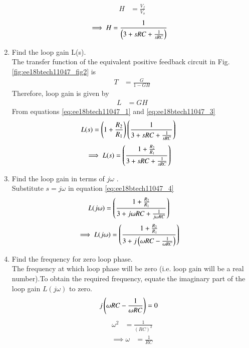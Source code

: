 \begin{enumerate}[label=\arabic*.,ref=\theenumi]
\begin{align}
H &= \frac{V_{f}}{V_{o}}
\end{align}
\begin{align}
\label{eq:ee18btech11047_3}
\implies H &= \frac{1}{\brak{3+sRC +\frac{1}{sRC}}}
\end{align}
%
\item Find the loop gain L(s).\\
\solution The transfer function of the equivalent positive feedback circuit in Fig. \ref{fig:ee18btech11047_fig2} is  
\begin{align}
T &= \frac{G}{1-GH}
\label{eq:ee18btech11047_TF}
\end{align}
Therefore, loop gain is given by 
\begin{align}
L &= GH
\end{align}
From equations \eqref{eq:ee18btech11047_1} and \eqref{eq:ee18btech11047_3}
\begin{align}
L(s) &= \left(1 + \frac{R_{2}}{R_{1}}\right)\left(\frac{1}{3+sRC+\frac{1}{sRC}}\right)
\end{align}
\begin{align}
\label{eq:ee18btech11047_4}
\implies L(s) &= \brak{\frac{1+\frac{R_{2}}{R_{1}}}{3+sRC+\frac{1}{sRC}}}
\end{align}
%
\item Find the loop gain in terms of $j\omega$ .\\
\solution Substitute $s = j\omega$ in equation \eqref{eq:ee18btech11047_4}
\begin{align} 
L(j\omega)&= \left(\frac{1+\frac{R_{2}}{R_{1}}}{3+j\omega RC+\frac{1}{j\omega RC}}\right)
\end{align}
\begin{align}
\label{eq:ee18btech11047_5}
\implies L(j\omega)&= \brak{\frac{1+\frac{R_{2}}{R_{1}}}{3+ j \brak{\omega RC-\frac{1}{\omega RC}}}}
\end{align}
\item Find the frequency for zero loop phase.\\
\solution The frequency at which loop phase will be zero (i.e. loop gain will be a real number).To obtain the required frequency, equate the imaginary part of the loop gain $L(j \omega )$ to zero.
\begin{align}
j\left(\omega RC - \frac{1}{\omega RC}\right) &= 0
\end{align}
\begin{align}
\omega^{2} &= \frac{1}{(RC)^{2}}
\end{align}
\begin{align}
\label{eq:ee18btech11047_freq}
\implies \omega &= \frac{1}{RC}

\end{align}
\end{enumerate}
